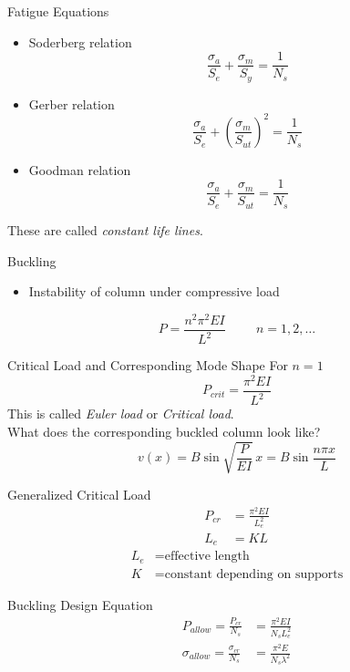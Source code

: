 \documentclass[10pt, svgnames]{beamer}
\begin{document}
\begin{frame}[label={sec:orgebfff61}]{Fatigue Equations}
\begin{itemize}
\item Soderberg relation
$$ \dfrac{\sigma_a}{S_e} + \dfrac{\sigma_m}{S_y} = \dfrac{1}{N_s} $$
\item Gerber relation
$$ \dfrac{\sigma_a}{S_e} + \left( \dfrac{\sigma_m}{S_{ut}} \right)^2 = \dfrac{1}{N_s} $$
\item Goodman relation
$$ \dfrac{\sigma_a}{S_e} + \dfrac{\sigma_m}{S_{ut}} = \dfrac{1}{N_s} $$
\end{itemize}


These are called \emph{constant life lines}.
\end{frame}

\begin{frame}[label={sec:org29bf11e}]{Buckling}
\begin{itemize}
\item Instability of column under compressive load
\end{itemize}

\vspace{3mm}
$$ P = \dfrac{n^2 \pi^2 E I}{L^2} \hspace{1cm}n = 1, 2, \ldots $$
\end{frame}

\begin{frame}[label={sec:orgfd6ae3a}]{Critical Load and Corresponding Mode Shape}
For \(n = 1\)
   $$ P_{crit} = \dfrac{\pi^2 E I}{L^2} $$
This is called \emph{Euler load} or \emph{Critical load}. \\\empty
\vspace{5mm}
What does the corresponding buckled column look like?
   $$ v(x) = B \sin \sqrt{\frac{P}{EI}} \, x = B \sin \dfrac{n \pi x}{L} $$
\end{frame}

\begin{frame}[label={sec:org19f1008}]{Generalized Critical Load}
\begin{align*}
  P_{cr} &= \frac{\pi^2 EI}{L_e^2} \\
       L_e &= KL
\end{align*}
\begin{align*}
  L_e &= \text{effective length} \\
  K &= \text{constant depending on supports}
\end{align*}
\end{frame}

\begin{frame}[label={sec:orgbefdd62}]{Buckling Design Equation}
\begin{align*}
  P_{allow} = \frac{P_{cr}}{N_{s}} &= \frac{\pi^2 EI}{N_{s}L_e^2} \\
  \sigma_{allow} = \frac{\sigma_{cr}}{N_{s}} &= \frac{\pi^2 E}{ N_{s}\lambda^2}
\end{align*}
\end{frame}
\end{document}

